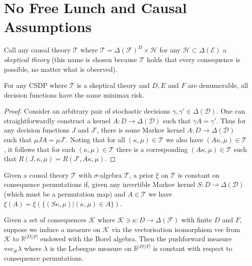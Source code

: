 \section{No Free Lunch and Causal Assumptions}
Call any causal theory $\mathscr{T}$ where $\mathscr{T}=\Delta(\mathcal{F})^D\times \mathscr{H}$ for any $\mathscr{H}\subset\Delta(\mathcal{E})$ a \emph{skeptical theory} (this name is chosen because $\mathscr{T}$ holds that every consequence is possible, no matter what is observed).


\begin{theorem}\label{th:nfl_mm}
For any CSDP where $\mathscr{T}$ is a skeptical theory and $D, E$ and $F$ are denumerable, all decision functions have the same minimax risk.
\end{theorem}

\begin{proof}
Consider an arbitrary pair of stochastic decisions $\gamma,\gamma'\in \Delta(\mathcal{D})$. One can straightforwardly construct a kernel $A:D\to \Delta(\mathcal{D})$ such that $\gamma A = \gamma'$. Thus for any decision functions $J$ and $J'$, there is some Markov kernel $A:D\to \Delta(\mathcal{D})$ such that $\mu J A = \mu J'$. Noting that for all $(\kappa,\mu)\in \mathscr{T}$ we also have $(A\kappa,\mu)\in \mathscr{T}$, it follows that for each $(\kappa,\mu)\in \mathscr{T}$ there is a corresponding $(A\kappa,\mu)\in \mathscr{T}$ such that $R(J,\kappa,\mu)=R(J',A\kappa,\mu)$.
\end{proof}

\begin{definition}
Given a causal theory $\mathscr{T}$ with $\sigma$-algebra $\mathcal{T}$, a prior $\xi$ on $\mathcal{T}$ is constant on consequence permutations if, given any invertible Markov kernel $S:D\to \Delta(\mathcal{D})$ (which must be a permutation map) and $A\in \mathcal{T}$ we have $\xi(A) = \xi(\{(S\kappa,\mu)|(\kappa,\mu)\in A\})$.
\end{definition}

\begin{lemma}\label{lem:lebesgue_measure_perm_pres}
Given a set of consequences $\mathscr{K}$ where $\mathscr{K}\ni\kappa:D\to \Delta(\mathcal{F})$ with finite $D$ and $F$, suppose we induce a measure on $\mathscr{K}$ via the vectorisation isomorphism $\text{vec}$ from $\mathscr{K}$ to $\mathbb{R}^{|D||F|}$ endowed with the Borel algebra. Then the pushforward measure $\mathrm{vec}_{\#}\lambda$ where $\lambda$ is the Lebesgue measure on $\mathbb{R}^{|D||F|}$ is constant with respect to consequence permutations.
\end{lemma}

